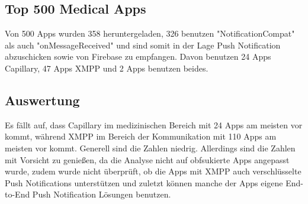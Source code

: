 \documentclass[sigconf]{acmart}
\begin{document}
\subsection{Top 500 Medical Apps}
Von 500 Apps wurden 358 heruntergeladen, 326 benutzen "NotificationCompat" als auch "onMessageReceived" 
und sind somit in der Lage Push Notification abzuschicken sowie von Firebase zu empfangen. Davon benutzen 24 Apps Capillary, 
47 Apps XMPP und 2 Apps benutzen beides.

\subsection{Auswertung}
Es fällt auf, dass Capillary im medizinischen Bereich mit 24 Apps am meisten vor kommt, während XMPP im Bereich
der Kommunikation mit 110 Apps am meisten vor kommt. Generell sind die Zahlen niedrig.
 Allerdings sind die Zahlen mit Vorsicht zu genießen, da die
Analyse nicht auf obfsukierte Apps angepasst wurde, zudem wurde nicht überprüft, ob die Apps mit XMPP auch verschlüsselte 
Push Notifications unterstützen und zuletzt können manche der Apps eigene End-to-End Push Notification Lösungen benutzen.



\end{document}
